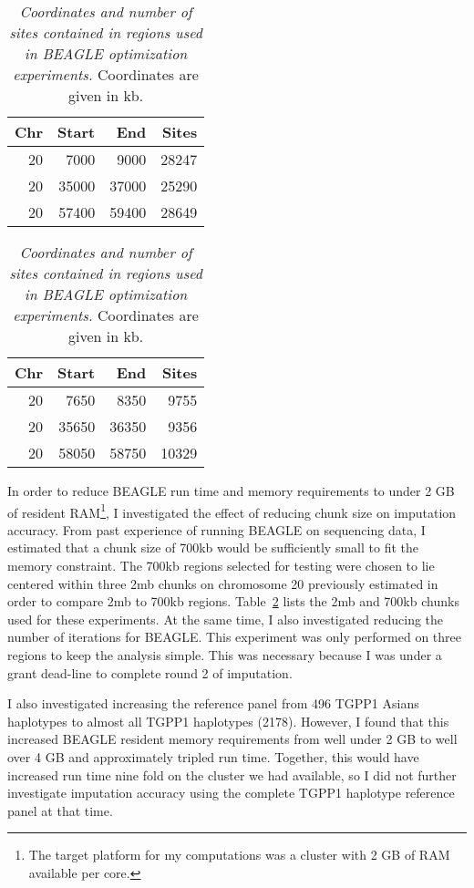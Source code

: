 \documentclass[a4paper]{article}
\begin{document}
\begin{table}[htbp]
  \begin{subtable}[b]{0.45\textwidth}
  \centering
  \begin{tabular}{rrrr}
    \toprule
    Chr & Start & End & Sites\\
    \midrule
    20 & 7000 & 9000 & 28247\\
    20 & 35000 & 37000 & 25290\\
    20 & 57400 & 59400 & 28649\\
    \bottomrule
  \end{tabular}
  \caption{2mb regions}
  \label{tab:2mbChunks}
\end{subtable}
\hfill
\begin{subtable}[b]{0.45\textwidth}
  \centering
  \begin{tabular}{rrrr}
    \toprule
    Chr & Start & End & Sites\\
    \midrule
    20 & 7650 & 8350 & 9755\\
    20 & 35650 & 36350 & 9356\\
    20 & 58050 & 58750 & 10329\\
    \bottomrule
  \end{tabular}
  \caption{700kb regions}
  \label{tab:700kbChunks}
\end{subtable}
\caption{\emph{Coordinates and number of sites contained in regions
    used in BEAGLE optimization experiments.} Coordinates are given in
    kb.}
\label{tab:chunks}
\end{table}

In order to reduce BEAGLE run time and memory requirements to under 2
GB of resident RAM\footnote{The target platform for my computations was a cluster with 2 GB of RAM
available per core.}, I
investigated the effect of reducing chunk size on imputation accuracy.
From past experience of running BEAGLE on sequencing data, I estimated
that a chunk size of 700kb would be sufficiently small
to fit the memory constraint.
The 700kb regions selected for testing were chosen to lie centered within three 2mb chunks
on chromosome 20  previously estimated in order to
compare 2mb to 700kb regions.  Table~\ref{tab:chunks} lists the 2mb
and 700kb chunks used for these experiments. At the
same time, I also investigated reducing the number of iterations for
BEAGLE. This experiment was only performed on three regions to keep
the analysis simple.  This was necessary because I was under a grant
dead-line to complete round 2 of imputation. 

I also investigated increasing the reference panel from 496 TGPP1
Asians haplotypes to almost all TGPP1 haplotypes (2178). However, I found
that this increased BEAGLE resident memory requirements from well
under 2 GB to well over 4 GB and approximately tripled run time.
Together, this would have increased run time nine fold on the
cluster we had available, so I did not further investigate imputation
accuracy using the complete TGPP1 haplotype reference panel at that time.
\end{document}
